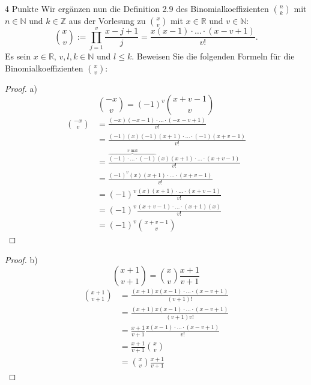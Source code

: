 \documentclass{problemset}
\begin{document}
\begin{problem}{4 Punkte}
Wir ergänzen nun die Definition 2.9 des Binomialkoeffizienten $n \choose k$ mit
$n \in \mathbb{N}$ und $k \in \mathbb{Z}$ aus der Vorlesung zu $x \choose v$
mit $x \in \mathbb{R}$ und $v \in \mathbb{N}$:
\[
    \binom{x}{v} := \prod_{j=1}^{v}\frac{x-j+1}{j} = \frac{x(x-1)\cdot\ldots\cdot(x-v+1)}{v!}.
\]
Es sein $x \in \mathbb{R}$, $v,l,k \in \mathbb{N}$ und $l \le k$. Beweisen
  Sie die folgenden Formeln für die Binomialkoeffizienten $\binom{x}{v}$:
\begin{proof}
    a)
    \begin{displaymath}
        \binom{-x}{v} = (-1)^v\binom{x+v-1}{v}
    \end{displaymath}
    \begin{align}
        \binom{-x}{v} & = \frac{(-x)(-x-1)\cdot\ldots\cdot(-x-v+1)}{v!}                                                 \\
                      & = \frac{(-1)(x)(-1)(x+1)\cdot\ldots\cdot(-1)(x+v-1)}{v!}                                        \\
                      & = \frac{\overbrace{(-1)\cdot\ldots\cdot(-1)}^{v\text{ mal}}(x)(x+1)\cdot\ldots\cdot(x+v-1)}{v!} \\
                      & = \frac{(-1)^v(x)(x+1)\cdot\ldots\cdot(x+v-1)}{v!}                                              \\
                      & = (-1)^v\frac{(x)(x+1)\cdot\ldots\cdot(x+v-1)}{v!}                                              \\
                      & = (-1)^v\frac{(x+v-1)\cdot\ldots\cdot(x+1)(x)}{v!}                                              \\
                      & = (-1)^v\binom{x+v-1}{v}
    \end{align}
\end{proof}
\begin{proof}
    b)
    \begin{displaymath}
        \binom{x+1}{v+1} = \binom{x}{v}\frac{x+1}{v+1}
    \end{displaymath}
    \begin{align}
        \binom{x+1}{v+1} & = \frac{(x+1)x(x-1)\cdot\ldots\cdot(x-v+1)}{(v+1)!}        \\
                         & = \frac{(x+1)x(x-1)\cdot\ldots\cdot(x-v+1)}{(v+1)v!}       \\
                         & = \frac{x+1}{v+1} \frac{x(x-1)\cdot\ldots\cdot(x-v+1)}{v!} \\
                         & = \frac{x+1}{v+1} \binom{x}{v}                             \\
                         & = \binom{x}{v} \frac{x+1}{v+1}
    \end{align}


\end{proof}
\end{problem}
\end{document}
